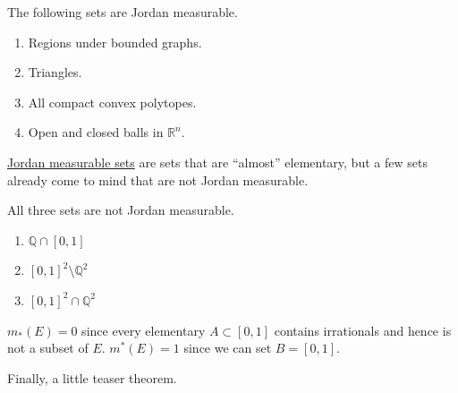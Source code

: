 	\begin{example}
	  \label{ex:jordan-measurable-sets}
    The following sets are Jordan measurable. 
		\begin{enumerate}
		  \item Regions under bounded graphs. 
			\item Triangles. 
			\item All compact convex polytopes. 
			\item Open and closed balls in $\mathbb{R}^n$. 
		\end{enumerate}
  \end{example}

  \hyperref[def:jordan-measurable-set-jordan-measure]{Jordan measurable sets} are sets that are ``almost'' elementary, but a few sets already come to mind that are not Jordan measurable. 

	\begin{example}
	  \label{ex:non-jordan-measurable-sets}
		All three sets are not Jordan measurable. 
    \begin{enumerate}
			\item $\mathbb{Q} \cap [0, 1]$
      \item $[0, 1]^2 \setminus \mathbb{Q}^2$
      \item $[0, 1]^2 \cap \mathbb{Q}^2$
    \end{enumerate}
		$m_\ast (E) = 0$ since every elementary $A \subset [0, 1]$ contains irrationals and hence is not a subset of $E$. $m^\ast (E) = 1$ since we can set $B = [0, 1]$. 
  \end{example} 

  Finally, a little teaser theorem. 

